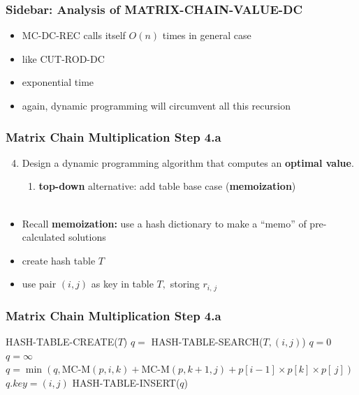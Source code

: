 \documentclass{beamer}
\newcommand{\stanza}{ \\~\ }
\begin{document}
\begin{frame} \frametitle{Sidebar: Analysis of MATRIX-CHAIN-VALUE-DC}
\begin{itemize}
  \item MC-DC-REC calls itself $O(n)$ times in general case
  \item like CUT-ROD-DC
  \item exponential time
  \item again, dynamic programming will circumvent all this recursion
\end{itemize}
\end{frame}

\begin{frame} \frametitle{Matrix Chain Multiplication Step 4.a}
  \begin{enumerate}
    \setcounter{enumi}{3}
    \item Design a dynamic programming algorithm that computes an \textbf{optimal value}.
    \begin{enumerate}
      \item \textbf{top-down} alternative: add table base case (\textbf{memoization})
      \stanza
    \end{enumerate}
\end{enumerate}

\begin{itemize}
  \item Recall \textbf{memoization:} use a hash dictionary to make a ``memo'' of pre-calculated solutions
  \item create hash table $T$
  \item use pair $(i, j)$ as key in table $T,$ storing $r_{i,\, j}$
\end{itemize}
\end{frame}

\begin{frame} \frametitle{Matrix Chain Multiplication Step 4.a}
  {\scriptsize
  \begin{algorithmic}[1]
    \State HASH-TABLE-CREATE($T$)
    \State {}
    \EndFunction
    \State $q = $ HASH-TABLE-SEARCH($T, (i, j)$)
      \State {}
    \EndIf
      \State $q=0$
    \Else
      \State $q = \infty$
        \State $q = \min(q, \text{MC-M}(p, i, k) + \text{MC-M}(p, k+1, j)+ p[i-1] \times p[k] \times p[\, j])$
      \EndFor
    \EndIf
    \State $q.key = (i, j)$
    \State HASH-TABLE-INSERT($q$)
    \State {}
    \EndFunction
  \end{algorithmic}
  }
\end{frame}
\end{document}
